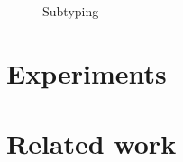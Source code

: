 \documentclass[sigplan,screen,review]{acmart}
\begin{document}
\begin{figure*}[h]
\begin{mathpar}



\end{mathpar}
\caption{Subtyping}
\label{fig:subtyping}
\end{figure*}





\section{Experiments}


\section{Related work}

\end{document}
